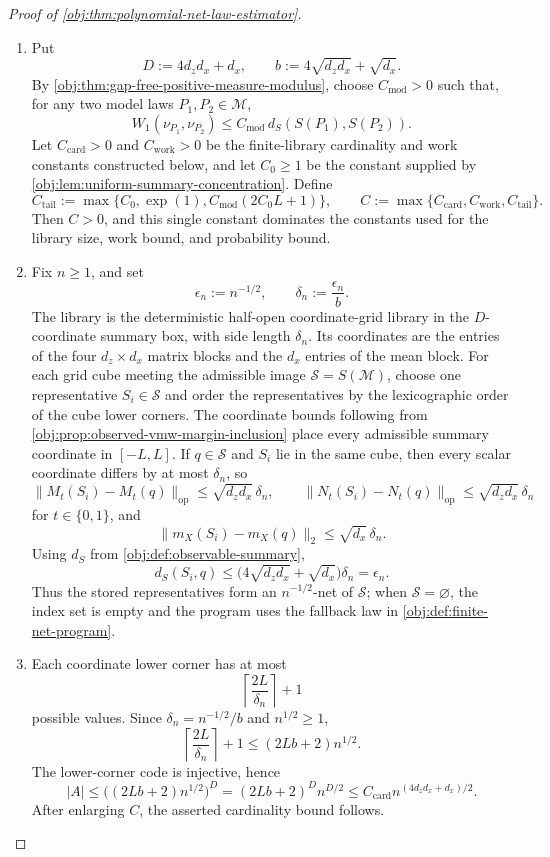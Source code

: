 \begin{proof}[Proof of \cref{obj:thm:polynomial-net-law-estimator}]
\begin{enumerate}
\item Put
\[
D:=4d_zd_x+d_x,\qquad
b:=4\sqrt{d_zd_x}+\sqrt{d_x}.
\]
By \cref{obj:thm:gap-free-positive-measure-modulus}, choose
\(C_{\mathrm{mod}}>0\) such that, for any two model laws \(P_1,P_2\in\mathcal M\),
\[
W_1(\nu_{P_1},\nu_{P_2})
\le C_{\mathrm{mod}}\,d_S(S(P_1),S(P_2)).
\]
Let \(C_{\mathrm{card}}>0\) and \(C_{\mathrm{work}}>0\) be the finite-library
cardinality and work constants constructed below, and let \(C_0\ge1\) be the
constant supplied by \cref{obj:lem:uniform-summary-concentration}.  Define
\[
C_{\mathrm{tail}}
:=
\max\{C_0,\exp(1),C_{\mathrm{mod}}(2C_0L+1)\},
\qquad
C:=\max\{C_{\mathrm{card}},C_{\mathrm{work}},C_{\mathrm{tail}}\}.
\]
Then \(C>0\), and this single constant dominates the constants used for the
library size, work bound, and probability bound. %

\item Fix \(n\ge1\), and set
\[
\epsilon_n:=n^{-1/2},\qquad
\delta_n:=\frac{\epsilon_n}{b}.
\]
The library is the deterministic half-open coordinate-grid library in the
\(D\)-coordinate summary box, with side length \(\delta_n\).  Its coordinates
are the entries of the four \(d_z\times d_x\) matrix blocks and the \(d_x\)
entries of the mean block.  For each grid cube meeting the admissible image
\(\mathscr S=S(\mathcal M)\), choose one representative \(S_i\in\mathscr S\)
and order the representatives by the lexicographic order of the cube lower
corners.  The coordinate bounds following from
\cref{obj:prop:observed-vmw-margin-inclusion} place every admissible summary
coordinate in \([-L,L]\).  If \(q\in\mathscr S\) and \(S_i\) lie in the same
cube, then every scalar coordinate differs by at most \(\delta_n\), so
\[
\|M_t(S_i)-M_t(q)\|_{\mathrm{op}}
\le \sqrt{d_zd_x}\,\delta_n,\qquad
\|N_t(S_i)-N_t(q)\|_{\mathrm{op}}
\le \sqrt{d_zd_x}\,\delta_n
\]
for \(t\in\{0,1\}\), and
\[
\|m_X(S_i)-m_X(q)\|_2\le \sqrt{d_x}\,\delta_n .
\]
Using \(d_S\) from \cref{obj:def:observable-summary},
\[
d_S(S_i,q)
\le
\bigl(4\sqrt{d_zd_x}+\sqrt{d_x}\bigr)\delta_n
=\epsilon_n .
\]
Thus the stored representatives form an \(n^{-1/2}\)-net of \(\mathscr S\);
when \(\mathscr S=\varnothing\), the index set is empty and the program uses
the fallback law in \cref{obj:def:finite-net-program}. %

\item Each coordinate lower corner has at most
\[
\left\lceil \frac{2L}{\delta_n}\right\rceil+1
\]
possible values.  Since \(\delta_n=n^{-1/2}/b\) and \(n^{1/2}\ge1\),
\[
\left\lceil \frac{2L}{\delta_n}\right\rceil+1
\le (2Lb+2)n^{1/2}.
\]
The lower-corner code is injective, hence
\[
|A|
\le \bigl((2Lb+2)n^{1/2}\bigr)^D
=(2Lb+2)^D n^{D/2}
\le C_{\mathrm{card}} n^{(4d_zd_x+d_x)/2}.
\]
After enlarging \(C\), the asserted cardinality bound follows. %


\end{enumerate}
\end{proof}
